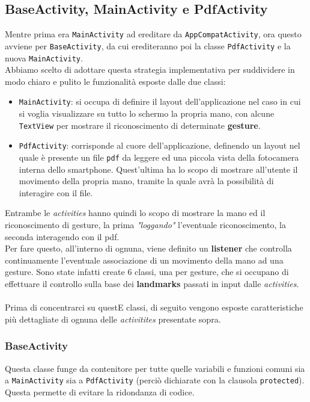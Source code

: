 \subsection{BaseActivity, MainActivity e PdfActivity}
Mentre prima era \texttt{MainActivity} ad ereditare da \texttt{AppCompatActivity}, ora questo avviene per \texttt{BaseActivity}, da cui erediteranno poi la classe \texttt{PdfActivity} e la nuova \texttt{MainActivity}.\\
Abbiamo scelto di adottare questa strategia implementativa per suddividere in modo chiaro e pulito le funzionalità esposte dalle due classi:
\begin{itemize}
    \item \texttt{MainActivity}: si occupa di definire il layout dell'applicazione nel caso in cui si voglia visualizzare su tutto lo schermo la propria mano, con alcune \texttt{TextView} per mostrare il riconoscimento di determinate \textbf{gesture}.
    \item \texttt{PdfActivity}: corrisponde al cuore dell'applicazione, definendo un layout nel quale è presente un file \texttt{pdf} da leggere ed una piccola vista della fotocamera interna dello smartphone. Quest'ultima ha lo scopo di mostrare all'utente il movimento della propria mano, tramite la quale avrà la possibilità di interagire con il file.
\end{itemize}
\noindent Entrambe le \textit{activities} hanno quindi lo scopo di mostrare la mano ed il riconoscimento di gesture, la prima \textit{"loggando"} l'eventuale riconoscimento, la seconda interagendo con il pdf.\\
Per fare questo, all'interno di ognuna, viene definito un \textbf{listener} che controlla continuamente l'eventuale associazione di un movimento della mano ad una gesture. Sono state infatti create 6 classi, una per gesture, che si occupano di effettuare il controllo sulla base dei \textbf{landmarks} passati in input dalle \textit{activities}.\\
\\
Prima di concentrarci su questE classi, di seguito vengono esposte caratteristiche più dettagliate di ognuna delle \textit{activitites} presentate sopra.

\subsubsection{BaseActivity}
Questa classe funge da contenitore per tutte quelle variabili e funzioni comuni sia a \texttt{MainActivity} sia a \texttt{PdfActivity} (perciò dichiarate con la clausola \texttt{protected}). Questa permette di evitare la ridondanza di codice.\\

